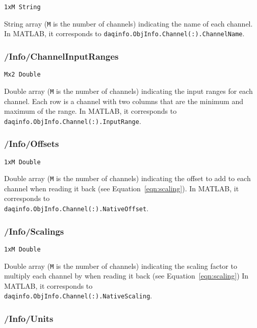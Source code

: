 \documentclass[12pt]{article} %
\begin{document}
\verb|1xM String|

String array (\verb|M| is the number of channels) indicating the name of each channel.
In MATLAB\textsuperscript{\textregistered}, it corresponds to \verb|daqinfo.ObjInfo.Channel(:).ChannelName|.



\subsubsection{/Info/ChannelInputRanges}

\verb|Mx2 Double|

Double array (\verb|M| is the number of channels) indicating the input ranges for each channel.
Each row is a channel with two columns that are the minimum and maximum of the range.
In MATLAB\textsuperscript{\textregistered}, it corresponds to \verb|daqinfo.ObjInfo.Channel(:).InputRange|.



\subsubsection{/Info/Offsets} \label{sec:info_offsets}

\verb|1xM Double|

Double array (\verb|M| is the number of channels) indicating the offset to add to each channel when reading it back (see Equation~\ref{eqn:scaling}).
In MATLAB\textsuperscript{\textregistered}, it corresponds to \\ \verb|daqinfo.ObjInfo.Channel(:).NativeOffset|.



\subsubsection{/Info/Scalings} \label{sec:info_scalings}

\verb|1xM Double|

Double array (\verb|M| is the number of channels) indicating the scaling factor to multiply each channel by when reading it back (see Equation~\ref{eqn:scaling})
In MATLAB\textsuperscript{\textregistered}, it corresponds to \\ \verb|daqinfo.ObjInfo.Channel(:).NativeScaling|.



\subsubsection{/Info/Units}
\end{document}
